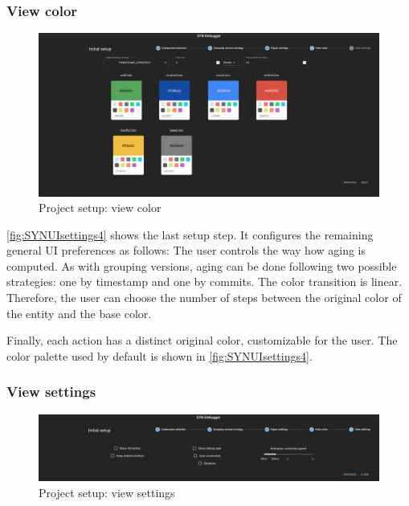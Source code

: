 \subsubsection*{View color}

\begin{figure}[h]
    \center
    \includegraphics[width=\textwidth]{SYNUI-settings4.png}
    \caption{Project setup: view color}
    \label{fig:SYNUIsettings4}
\end{figure}

\autoref{fig:SYNUIsettings4} shows the last setup step. It configures the remaining general UI preferences as follows:
The user controls the way how aging is computed. 
As with grouping versions, aging can be done following two possible strategies: one by timestamp and one by commits. 
The color transition is linear. Therefore, the user can choose the number of steps between the original color of the entity and the base color. 

Finally, each action has a distinct original color, customizable for the user. The color palette used by default is shown in \autoref{fig:SYNUIsettings4}.



\subsubsection*{View settings}

\begin{figure}[h]
    \center
    \includegraphics[width=\textwidth]{SYNUI-settings5.png}
    \caption{Project setup: view settings}
    \label{fig:SYNUIsettings5}
\end{figure}


